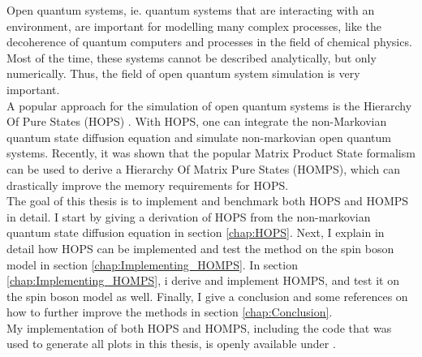 Open quantum systems, ie. quantum systems that are interacting with an environment, are important for modelling many complex
processes, like the decoherence of quantum computers and processes in the field of chemical physics.
Most of the time, these systems cannot be described analytically, but only numerically. Thus, the field of open quantum system
simulation is very important.\\
A popular approach for the simulation of open quantum systems is the Hierarchy Of Pure States (HOPS) \cite{Suess:2014}.
With HOPS, one can integrate the non-Markovian quantum state diffusion equation and simulate non-markovian open quantum systems.
Recently, it was shown that the popular Matrix Product State formalism can be used to derive a Hierarchy Of Matrix Pure States (HOMPS),
which can drastically improve the memory requirements for HOPS. \\
The goal of this thesis is to implement and benchmark both HOPS and HOMPS in detail. I start by giving a derivation of HOPS
from the non-markovian quantum state diffusion equation in section \ref{chap:HOPS}. Next, I explain in detail how HOPS can be implemented and
test the method on the spin boson model in section \ref{chap:Implementing_HOMPS}. In section \ref{chap:Implementing_HOMPS}, i derive and implement
HOMPS, and test it on the spin boson model as well. Finally, I give a conclusion and some references on how to further improve the methods in
section \ref{chap:Conclusion}.
\\
My implementation of both HOPS and HOMPS, including the code that was used to generate all plots in this thesis, is openly available
under \cite{Sappler:2023}.



